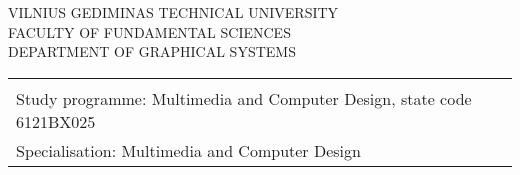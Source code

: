 {\fontsize{10}{12}\selectfont
\begin{center}
\scshape VILNIUS GEDIMINAS TECHNICAL UNIVERSITY\\
\scshape FACULTY OF FUNDAMENTAL SCIENCES\\
\scshape DEPARTMENT OF GRAPHICAL SYSTEMS\\[2.0\baselineskip]
\end{center}
%
\noindent
\begin{tabularx}{\textwidth}{Xc}
\begin{minipage}[t]{0.8\textwidth}
    {Study field: Informatics Engineering}\\
    {Study programme: Multimedia and Computer Design, state code 6121BX025}\\
    {Specialisation: Multimedia and Computer Design}
\end{minipage}
\vspace{1cm}


\end{tabularx}}
